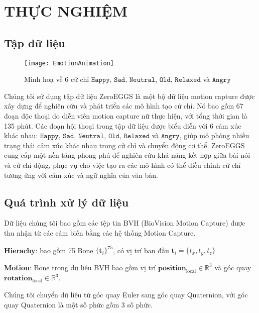 \chapter{THỰC NGHIỆM}
\label{Chapter4}

\section{Tập dữ liệu}

\setcounter{figure}{12}
\begin{figure}
	\centering
	\texttt{[image: EmotionAnimation]}
	\caption{Minh hoạ về 6 cử chỉ $\texttt{Happy}$, $\texttt{Sad}$, $\texttt{Neutral}$, $\texttt{Old}$, $\texttt{Relaxed}$ và $\texttt{Angry}$}
\end{figure}

Chúng tôi sử dụng tập dữ liệu ZeroEGGS \cite{ghorbani2022zeroeggszeroshotexamplebasedgesture} là một bộ dữ liệu motion capture được xây dựng để nghiên cứu và phát triển các mô hình tạo cử chỉ. Nó bao gồm 67 đoạn độc thoại do diễn viên motion capture nữ thực hiện, với tổng thời gian là 135 phút. Các đoạn hội thoại trong tập dữ liệu được biểu diễn với 6 cảm xúc khác nhau: $\texttt{Happy}$, $\texttt{Sad}$, $\texttt{Neutral}$, $\texttt{Old}$, $\texttt{Relaxed}$ và $\texttt{Angry}$, giúp mô phỏng nhiều trạng thái cảm xúc khác nhau trong cử chỉ và chuyển động cơ thể. ZeroEGGS cung cấp một nền tảng phong phú để nghiên cứu khả năng kết hợp giữa bài nói và cử chỉ động, phục vụ cho việc tạo ra các mô hình có thể điều chỉnh cử chỉ tương ứng với cảm xúc và ngữ nghĩa của văn bản.

\section{Quá trình xử lý dữ liệu}

Dữ liệu chúng tôi bao gồm các tệp tin BVH (BioVision Motion Capture) được thu nhận từ các cảm biến bằng các hệ thống Motion Capture. 


\textbf{Hierachy}: bao gồm 75 Bone $\{ \mathbf{t}_i \}^{75} $, có vị trí ban đầu  $\mathbf{t}_{i} = \{t_x, t_y, t_z\}$


\vspace{5pt}


\textbf{Motion}:
Bone trong dữ liệu BVH bao gồm vị trí $\mathbf{position}_{\operatorname{local}}  \in \mathbb{R}^{3}$ và góc quay $\mathbf{rotation}_{\operatorname{local}} \in \mathbb{R}^{3}$.

Chúng tôi chuyển dữ liệu từ góc quay Euler sang góc quay Quaternion, với góc quay Quaternion là một số phức gồm 3 số phức. 

